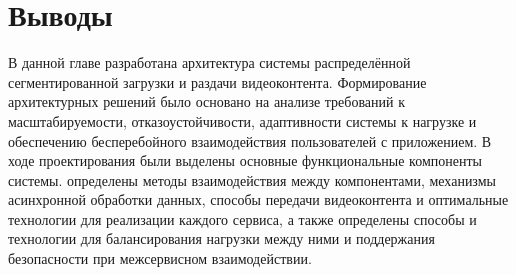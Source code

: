 \section{Выводы}

	В данной главе разработана архитектура системы распределённой сегментированной загрузки и раздачи видеоконтента. Формирование архитектурных решений было основано на анализе требований к масштабируемости, отказоустойчивости, адаптивности системы к нагрузке и обеспечению бесперебойного взаимодействия пользователей с приложением. В ходе проектирования были выделены основные функциональные компоненты системы. определены методы взаимодействия между компонентами, механизмы асинхронной обработки данных, способы передачи видеоконтента и оптимальные технологии для реализации каждого сервиса, а также определены способы и технологии для балансирования нагрузки между ними и поддержания безопасности при межсервисном взаимодействии.
	
